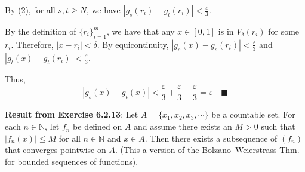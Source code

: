 \documentclass[12pt]{article}
\newcommand{\qed}{\quad \blacksquare}
\newcommand{\abs}[1]{\left\vert #1 \right\vert}
\newcommand{\ep}{\varepsilon}
\begin{document}
\begin{enumerate}
            By (2), for all $s, t \geq N$, we have $\abs{g_s(r_i) - g_t(r_i)} < \frac{\ep}{3}$. 

            By the definition of $\{r_i\}_{i=1}^m$, we have that any $x \in [0, 1]$ is in $V_\delta(r_i)$ for some $r_i$. Therefore, $\abs{x - r_i} < \delta$. By equicontinuity, $\abs{g_s(x) - g_s(r_i)} < \frac{\ep}{3}$ and $\abs{g_t(x) - g_t(r_i)} < \frac{\ep}{3}$.

            Thus, 
            \[\abs{g_s(x) - g_t(x)} < \frac{\ep}{3} + \frac{\ep}{3} + \frac{\ep}{3} = \ep \qed\]
        \color{black}
\end{enumerate}

\textbf{Result from Exercise 6.2.13}: Let $A=\{x_1,x_2,x_3,\cdots\}$ be a countable set. For each $n\in\mathbb{N}$, let $f_n$ be defined on $A$ and assume there exists an $M>0$ such that $|f_n(x)|\leq M$ for all $n\in\mathbb{N}$ and $x\in A$. Then there exists a subsequence of $(f_n)$ that converges pointwise on $A$. (This a version of the Bolzano--Weierstrass Thm. for bounded sequences of functions).

\pagebreak
\end{document}
